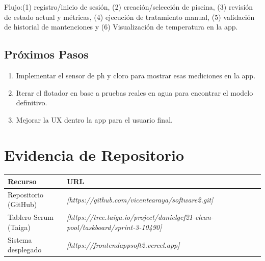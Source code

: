 \documentclass[11pt, a4paper]{article}
\begin{document}
\vspace{0.3em}
Flujo:(1) registro/inicio de sesión, (2) creación/selección de piscina, (3) revisión de estado actual y métricas, (4) ejecución de tratamiento manual, (5) validación de historial de mantenciones y (6) Visualización de temperatura en la app.

\subsection{Próximos Pasos}

\begin{enumerate}
  \item Implementar el sensor de ph y cloro para mostrar esas mediciones en la app.
  \item Iterar el flotador en base a pruebas reales en agua para encontrar el modelo definitivo.
  \item Mejorar la UX dentro la app para el usuario final.
\end{enumerate}

\appendix
\renewcommand{\thesection}{Anexo \Alph{section}}

\section{Evidencia de Repositorio}

\begin{tabularx}{\textwidth}{@{} l X @{}}
  \toprule
  \textbf{Recurso} & \textbf{URL} \\
  \midrule
  Repositorio (GitHub) & \textit{[https://github.com/vicentearaya/software2.git]} \\
  Tablero Scrum (Taiga)  & \textit{[https://tree.taiga.io/project/danielgcf21-clean-pool/taskboard/sprint-3-10490]} \\
  Sistema desplegado             & \textit{[https://frontendappsoft2.vercel.app]} \\
  \bottomrule
\end{tabularx}

\end{document}
